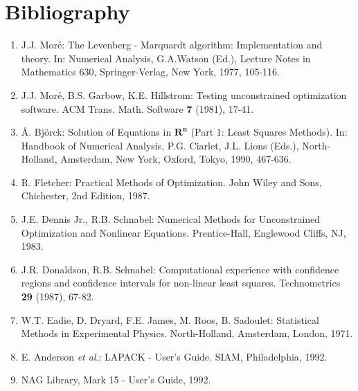 \chapter*{Bibliography}
\begin{enumerate}
\item J.J. Mor\'e: The Levenberg - Marquardt algorithm:
      Implementation and theory.
      In: Numerical Analysis, G.A.Watson (Ed.),
      Lecture Notes in Mathematics 630,
      Springer-Verlag, New York, 1977, 105-116.
\item J.J. Mor\'e, B.S. Garbow, K.E. Hillstrom:
      Testing unconstrained optimization software.
      ACM Trans. Math. Software {\bf 7} (1981), 17-41.
\item \AA. Bj\"orck: Solution of Equations in $\mathbf{R^n}$
      (Part 1: Least Squares Methods).
      In: Handbook of Numerical Analysis,
      P.G. Ciarlet, J.L. Lions (Eds.),
      North-Holland, Amsterdam, New York, Oxford,
      Tokyo, 1990, 467-636.
\item R. Fletcher:  Practical Methods of Optimization.
      John Wiley and Sons, Chichester, 2nd Edition, 1987.
\item J.E. Dennis Jr., R.B. Schnabel: Numerical Methods for
      Unconstrained Optimization and Nonlinear Equations.
      Prentice-Hall, Englewood Cliffs, NJ, 1983.
\item J.R. Donaldson, R.B. Schnabel: Computational experience with
      confidence regions and confidence intervals for non-linear
      least squares. Technometrics {\bf 29} (1987), 67-82.
\item W.T. Eadie, D. Dryard, F.E. James, M. Roos, B. Sadoulet:
      Statistical Methods in Experimental Physics.
      North-Holland, Amsterdam, London, 1971.
\item E. Anderson {\it et al}.: LAPACK - User's Guide.
      SIAM, Philadelphia, 1992.
\item NAG Library, Mark 15 - User's Guide, 1992.
\end{enumerate}








